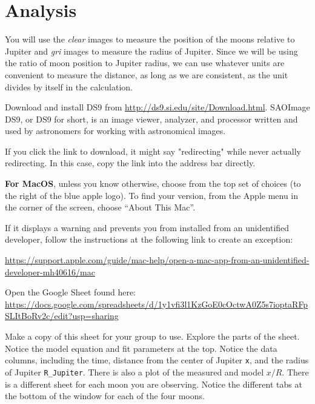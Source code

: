 \section{Analysis}

You will use the \textit{clear} images to measure the position of the moons relative to Jupiter and
\textit{gri} images to measure the radius of Jupiter. Since we will be using the ratio of moon position to Jupiter radius, we can use whatever units are convenient to measure the distance, as long as we are consistent, as the unit divides by itself in the calculation.

\begin{steps}
	
	\item Download and install DS9 from \url{http://ds9.si.edu/site/Download.html}. SAOImage DS9, or DS9 for short, is an image viewer, analyzer, and processor written and used by astronomers for working with astronomical images.
	
	If you click the link to download, it might say "redirecting" while never actually redirecting. In this case, copy the link into the address bar directly.
	\begin{framed}	
		\textbf{For MacOS}, unless you know otherwise, choose from the top set of choices (to the right of
		the blue apple logo). To find your version, from the Apple menu in the corner of the screen,
		choose “About This Mac”.
		
		If it displays a warning and prevents you from installed from an unidentified developer, follow the instructions at the following link to create an exception:
		
		\url{https://support.apple.com/guide/mac-help/open-a-mac-app-from-an-unidentified-developer-mh40616/mac}
	\end{framed}

	\item Open the Google Sheet found here: \url{https://docs.google.com/spreadsheets/d/1y1vfi3l1KzGoE0cOctwA0Z5s7ioptaRFpSLItBoRv2c/edit?usp=sharing}
	
	\item Make a copy of this sheet for your group to use. Explore the parts of the sheet. Notice the model equation and fit parameters at the top. Notice the data columns, including the time, distance from the center of Jupiter \texttt{x}, and the radius of Jupiter \texttt{R\_Jupiter}. There is also a plot of the measured and model $x/R$. There is a different sheet for each moon you are observing. Notice the different tabs at the bottom of the window for each of the four moons.
	

\end{steps}
